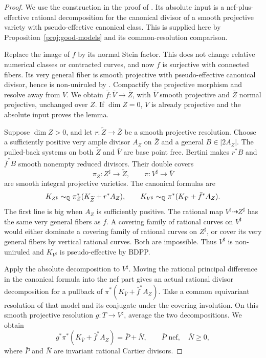 \begin{proof}
We use the construction in the proof of
\cite[Proposition~3.3]{External037}. Its absolute input is a nef-plus-
effective rational decomposition for the canonical divisor of a smooth
projective variety with pseudo-effective canonical class. This is supplied
here by Proposition~\ref{proj:good-models} and its common-resolution
comparison.

Replace the image of \(f\) by its normal Stein factor. This does not change
relative numerical classes or contracted curves, and now \(f\) is
surjective with connected fibers. Its very general fiber is smooth
projective with pseudo-effective canonical divisor, hence is non-uniruled
by \cite[Theorem~0.2 and Corollary~0.3]{BDPP}. Compactify the projective
morphism and resolve away from \(V\). We obtain
\(\bar f:\bar V\to\bar Z\), with \(\bar V\) smooth projective and
\(\bar Z\) normal projective, unchanged over \(Z\). If \(\dim Z=0\),
\(V\) is already projective and the absolute input proves the lemma.

Suppose \(\dim Z>0\), and let \(r:\widetilde Z\to\bar Z\) be a smooth
projective resolution. Choose a sufficiently positive very ample divisor
\(A_Z\) on \(\bar Z\) and a general \(B\in|2A_Z|\). The pulled-back systems
on both \(\widetilde Z\) and \(\bar V\) are base point free. Bertini makes
\(r^*B\) and \(\bar f^*B\) smooth nonempty reduced divisors. Their double
covers
\[
 \pi_Z:Z^\sharp\to\widetilde Z,
 \qquad \pi:V^\sharp\to\bar V
\]
are smooth integral projective varieties. The canonical formulas are
\[
 K_{Z^\sharp}\sim_{\mathbb Q}\pi_Z^*(K_{\widetilde Z}+r^*A_Z),
 \qquad
 K_{V^\sharp}\sim_{\mathbb Q}\pi^*(K_{\bar V}+\bar f^*A_Z).
\]
The first line is big when \(A_Z\) is sufficiently positive. The rational
map \(V^\sharp\dashrightarrow Z^\sharp\) has the same very general fibers
as \(f\). A covering family of rational curves on \(V^\sharp\) would
either dominate a covering family of rational curves on \(Z^\sharp\), or
cover its very general fibers by vertical rational curves. Both are
impossible. Thus \(V^\sharp\) is non-uniruled and \(K_{V^\sharp}\) is
pseudo-effective by BDPP.

Apply the absolute decomposition to \(V^\sharp\). Moving the rational
principal difference in the canonical formula into the nef part gives an
actual rational divisor decomposition for a pullback of
\(\pi^*(K_{\bar V}+\bar f^*A_Z)\). Take a common equivariant resolution of
that model and its conjugate under the covering involution. On this smooth
projective resolution \(g:T\to V^\sharp\), average the two decompositions.
We obtain
\[
 g^*\pi^*(K_{\bar V}+\bar f^*A_Z)=\bar P+\bar N,
 \qquad \bar P\text{ nef},\quad \bar N\geq0,
\]
where \(\bar P\) and \(\bar N\) are invariant rational Cartier divisors.


\end{proof}
